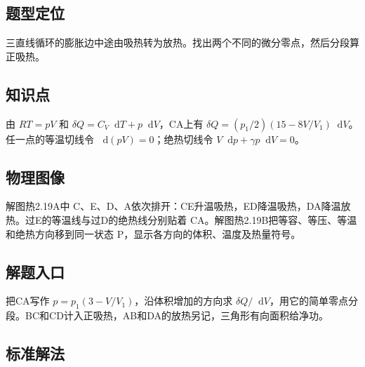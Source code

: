\documentclass[UTF8,fontset=fandol,a4paper,11pt]{ctexart}
\newcommand{\dd}{\mathop{}\!\mathrm{d}}
\begin{document}


\subsection*{题型定位}

三直线循环的膨胀边中途由吸热转为放热。找出两个不同的微分零点，然后分段算正吸热。



\subsection*{知识点}

由 $RT=pV$ 和 $\delta Q=C_V\dd T+p\dd V$，CA上有 $\delta Q=(p_1/2)(15-8V/V_1)\dd V$。任一点的等温切线令 $\dd(pV)=0$；绝热切线令 $V\dd p+\gamma p\dd V=0$。




\subsection*{物理图像}

解图热2.19A中 C、E、D、A依次排开：CE升温吸热，ED降温吸热，DA降温放热。过E的等温线与过D的绝热线分别贴着 CA。解图热2.19B把等容、等压、等温和绝热方向移到同一状态 P，显示各方向的体积、温度及热量符号。



\subsection*{解题入口}

把CA写作 $p=p_1(3-V/V_1)$，沿体积增加的方向求 $\delta Q/\dd V$，用它的简单零点分段。BC和CD计入正吸热，AB和DA的放热另记，三角形有向面积给净功。




\subsection*{标准解法}
\end{document}
